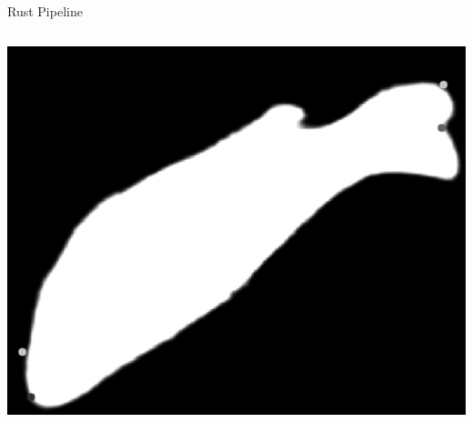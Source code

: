 \begin{frame}{Rust Pipeline}
  \begin{columns}[c]
        \centering
        \includegraphics[height=0.45\textheight,keepaspectratio]{./images/img1.png}
  

\end{columns}
\end{frame}

